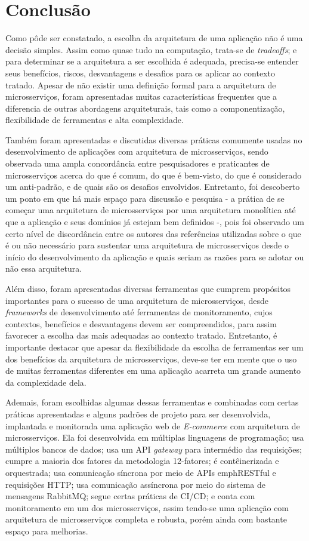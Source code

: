 \chapter{Conclusão}\label{chapter-conclusao}
Como pôde ser constatado, a escolha da arquitetura de uma aplicação não é uma decisão simples. Assim como quase tudo na computação, trata-se de \emph{tradeoffs}; e para determinar se a arquitetura a ser escolhida é adequada, precisa-se entender seus benefícios, riscos, desvantagens e desafios para os aplicar ao contexto tratado. Apesar de não existir uma definição formal para a arquitetura de microsserviços, foram apresentadas muitas características frequentes que a diferencia de outras abordagens arquiteturais, tais como a componentização, flexibilidade de ferramentas e alta complexidade.

Também foram apresentadas e discutidas diversas práticas comumente usadas no desenvolvimento de aplicações com arquitetura de microsserviços, sendo observada uma ampla concordância entre pesquisadores e praticantes de microsserviços acerca do que é comum, do que é bem-visto, do que é considerado um anti-padrão, e de quais são os desafios envolvidos. Entretanto, foi descoberto um ponto em que há mais espaço para discussão e pesquisa - a prática de se começar uma arquitetura de microsserviços por uma arquitetura monolítica até que a aplicação e seus domínios já estejam bem definidos -, pois foi observado um certo nível de discordância entre os autores das referências utilizadas sobre o que é ou não necessário para sustentar uma arquitetura de microsserviços desde o início do desenvolvimento da aplicação e quais seriam as razões para se adotar ou não essa arquitetura.

Além disso, foram apresentadas diversas ferramentas que cumprem propósitos importantes para o sucesso de uma arquitetura de microsserviços, desde \emph{frameworks} de desenvolvimento até ferramentas de monitoramento, cujos contextos, benefícios e desvantagens devem ser compreendidos, para assim favorecer a escolha das mais adequadas ao contexto tratado. Entretanto, é importante destacar que apesar da flexibilidade da escolha de ferramentas ser um dos benefícios da arquitetura de microsserviços, deve-se ter em mente que o uso de muitas ferramentas diferentes em uma aplicação acarreta um grande aumento da complexidade dela.

Ademais, foram escolhidas algumas dessas ferramentas e combinadas com certas práticas apresentadas e alguns padrões de projeto para ser desenvolvida, implantada e monitorada uma aplicação web de \emph{E-commerce} com arquitetura de microsserviços. Ela foi desenvolvida em múltiplas linguagens de programação; usa múltiplos bancos de dados; usa um API \emph{gateway} para intermédio das requisições; cumpre a maioria dos fatores da metodologia 12-fatores; é contêinerizada e orquestrada; usa comunicação síncrona por meio de APIs emph{RESTful} e requisições HTTP; usa comunicação assíncrona por meio do sistema de mensagens RabbitMQ; segue certas práticas de CI/CD; e conta com monitoramento em um dos microsserviços, assim tendo-se uma aplicação com arquitetura de microsserviços completa e robusta, porém ainda com bastante espaço para melhorias. 

